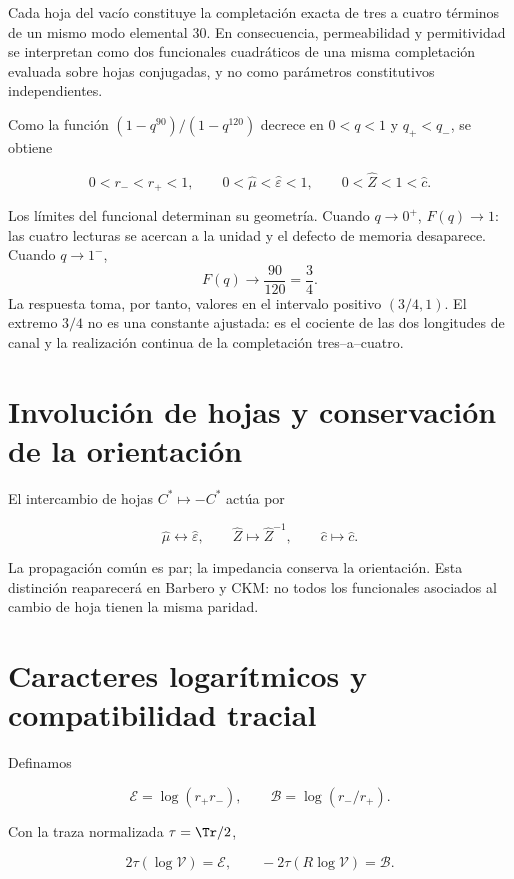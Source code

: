 Cada hoja del vac\'io constituye la completaci\'on exacta de tres a cuatro
t\'erminos de un mismo modo elemental \(30\). En consecuencia, permeabilidad
y permitividad se interpretan como dos funcionales cuadr\'aticos de una misma
completaci\'on evaluada sobre hojas conjugadas, y no como par\'ametros
constitutivos independientes.

Como la funci\'on \((1-q^{90})/(1-q^{120})\) decrece en \(0<q<1\) y \(q_+<q_-\), se obtiene

\[
0<r_-<r_+<1,\qquad
0<\widehat\mu<\widehat\varepsilon<1,\qquad
0<\widehat Z<1<\widehat c.
\]

Los l\'imites del funcional determinan su geometr\'ia. Cuando \(q\to0^+\),
\(F(q)\to1\): las cuatro lecturas se acercan a la unidad y el defecto de
memoria desaparece. Cuando \(q\to1^-\),
\[
F(q)\longrightarrow\frac{90}{120}=\frac34.
\]
La respuesta toma, por tanto, valores en el intervalo positivo \((3/4,1)\). El
extremo \(3/4\) no es una constante ajustada: es el cociente de las dos
longitudes de canal y la realizaci\'on continua de la completaci\'on
tres--a--cuatro.

\section{Involuci\'on de hojas y conservaci\'on de la orientaci\'on}

El intercambio de hojas \(C^*\mapsto-C^*\) act\'ua por

\begin{equation}
\widehat\mu\longleftrightarrow\widehat\varepsilon,\qquad
\widehat Z\longmapsto\widehat Z^{-1},
\qquad
\widehat c\longmapsto\widehat c.
\label{p3-83-c31-s1:eq:vacuum-sheet}
\end{equation}

La propagaci\'on com\'un es par; la impedancia conserva la orientaci\'on.
Esta distinci\'on reaparecer\'a en Barbero y CKM: no todos los funcionales
asociados al cambio de hoja tienen la misma paridad.

\section{Caracteres logar\'itmicos y compatibilidad tracial}

Definamos

\[
\mathcal E=\log(r_+r_-),\qquad
\mathcal B=\log(r_-/r_+).
\]

Con la traza normalizada \(\tau=\Tr/2\),

\begin{equation}
2\tau(\log\mathcal V)=\mathcal E,
\qquad
-2\tau(R\log\mathcal V)=\mathcal B.
\label{p3-83-c31-s1:eq:vacuum-traces}
\end{equation}

